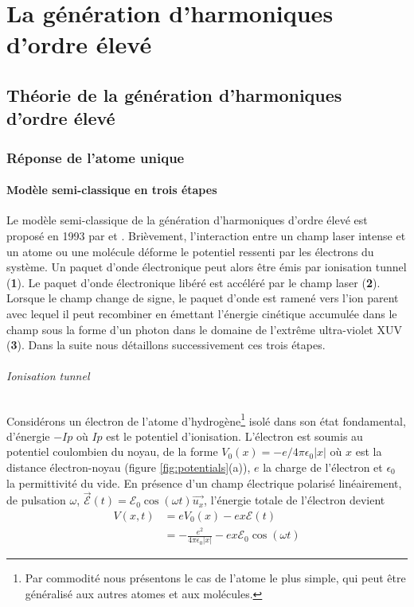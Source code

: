 
\part{La génération d'harmoniques d'ordre élevé}
\label{part:GHOE}
\chapter{Théorie de la génération d'harmoniques d'ordre élevé}
\label{chap:ThHHG}
\section{Réponse de l'atome unique}
\subsection{Modèle semi-classique en trois étapes}
Le modèle semi-classique de la génération d'harmoniques d'ordre élevé est proposé en 1993 par  et . Brièvement, l'interaction entre un champ laser intense et un atome ou une molécule déforme le potentiel ressenti par les électrons du système. Un paquet d'onde électronique peut alors être émis par ionisation tunnel (\textbf{1}). Le paquet d'onde électronique libéré est accéléré par le champ laser (\textbf{2}). Lorsque le champ change de signe, le paquet d'onde est ramené vers l'ion parent avec lequel il peut recombiner en émettant l'énergie cinétique accumulée dans le champ sous la forme d'un photon dans le domaine de l'extrême ultra-violet XUV (\textbf{3}). Dans la suite nous détaillons successivement ces trois étapes.

\paragraph{Ionisation tunnel} Considérons un électron de l'atome d'hydrogène\footnote{Par commodité nous présentons le cas de l'atome le plus simple, qui peut être généralisé aux autres atomes et aux molécules.} isolé dans son état fondamental, d'énergie $-Ip$ où $Ip$ est le potentiel d'ionisation. L'électron est soumis au potentiel coulombien du noyau, de la forme $V_0 (x) = - e /4\pi \epsilon_0 |x|$ où $x$ est la distance électron-noyau (figure \ref{fig:potentials}(a)), $e$ la charge de l'électron et $\epsilon_0$ la permittivité du vide. En présence d'un champ électrique polarisé linéairement, de pulsation $\omega$, $\vec{\mathcal{E}}(t) = \mathcal{E}_0 \cos(\omega t) \vec{u_x}$, l'énergie totale de l'électron devient
\begin{align}
V(x,t) & = e V_0 (x) - e x \mathcal{E}(t) \\
& = -\frac{e^2}{4\pi \epsilon_0 |x|} - e x \mathcal{E}_0 \cos(\omega t)
\label{eq:PotentielEffectif}
\end{align}

